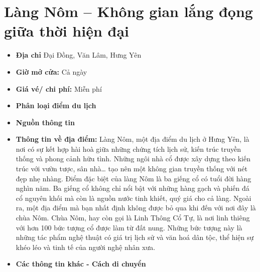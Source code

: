 \documentclass{article}
\begin{document}
\section{Làng Nôm – Không gian lắng đọng giữa thời hiện đại}
\begin{itemize}
    \item{\textbf{Địa chỉ}} Đại Đồng, Văn Lâm, Hưng Yên

    \item{\textbf{Giờ mở cửa:}} Cả ngày

    \item{\textbf{Giá vé/ chi phí:}} Miễn phí

    \item{\textbf{Phân loại điểm du lịch}}

    \item{\textbf{Nguồn thông tin}}

    \item{\textbf{Thông tin về địa điểm:}} Làng Nôm, một địa điểm du lịch ở Hưng Yên, là nơi có sự kết hợp hài hoà giữa những chứng tích lịch sử, kiến trúc truyền thống và phong cảnh hữu tình. Những ngôi nhà cổ được xây dựng theo kiến trúc với vườn tược, sân nhà… tạo nên một không gian truyền thống với nét đẹp nhẹ nhàng. Điểm đặc biệt của làng Nôm là ba giếng cổ có tuổi đời hàng nghìn năm. Ba giếng cổ không chỉ nổi bật với những hàng gạch và phiến đá cổ nguyên khối mà còn là nguồn nước tinh khiết, quý giá cho cả làng. Ngoài ra, một địa điểm mà bạn nhất định không được bỏ qua khi đến với nơi đây là chùa Nôm. Chùa Nôm, hay còn gọi là Linh Thông Cổ Tự, là nơi linh thiêng với hơn 100 bức tượng cổ được làm từ đất nung. Những bức tượng này là những tác phẩm nghệ thuật có giá trị lịch sử và văn hoá dân tộc, thể hiện sự khéo léo và tinh tế của người nghệ nhân xưa.
\end{itemize}

\begin{itemize}
    \item{\textbf{Các thông tin khác - Cách di chuyển}}
\end{itemize}
\end{document}
